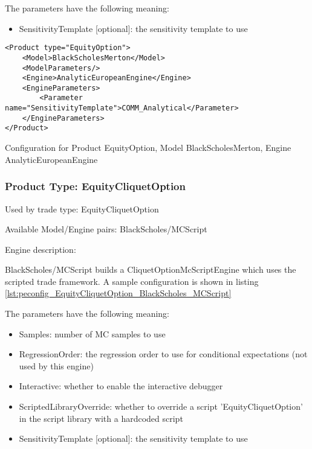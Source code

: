 The parameters have the following meaning:

\begin{itemize}
\item SensitivityTemplate [optional]: the sensitivity template to use 
\end{itemize}

\begin{longlisting}
\begin{verbatim}
<Product type="EquityOption">
    <Model>BlackScholesMerton</Model>
    <ModelParameters/>
    <Engine>AnalyticEuropeanEngine</Engine>
    <EngineParameters>
        <Parameter name="SensitivityTemplate">COMM_Analytical</Parameter>
    </EngineParameters>
</Product>
\end{verbatim}
\caption{Configuration for Product EquityOption, Model BlackScholesMerton, Engine AnalyticEuropeanEngine}
\label{lst:peconfig_EquityOption_BlackScholesMerton_AnalyticEuropeanEngine}
\end{longlisting}

\subsubsection{Product Type: EquityCliquetOption}

Used by trade type: EquityCliquetOption

Available Model/Engine pairs: BlackScholes/MCScript

Engine description:

BlackScholes/MCScript builds a CliquetOptionMcScriptEngine which uses the scripted trade framework. A sample
configuration is shown in listing \ref{lst:peconfig_EquityCliquetOption_BlackScholes_MCScript}

The parameters have the following meaning:

\begin{itemize}
\item Samples: number of MC samples to use
\item RegressionOrder: the regression order to use for conditional expectations (not used by this engine)
\item Interactive: whether to enable the interactive debugger
\item ScriptedLibraryOverride: whether to override a script 'EquityCliquetOption' in the script library with a hardcoded script
\item SensitivityTemplate [optional]: the sensitivity template to use 
\end{itemize}

